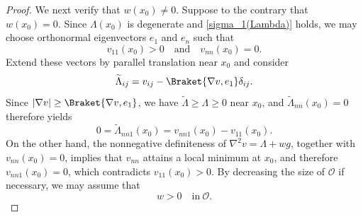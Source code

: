 \documentclass[11pt]{amsart}
\numberwithin{theorem}{section}
\numberwithin{equation}{section}
\begin{document}
\begin{proof}
We next verify that $w(x_0)\neq 0$. Suppose to the contrary that $w(x_0)=0$. Since $\Lambda(x_0)$ is degenerate and \eqref{sigma_1(Lambda)} holds, we may choose orthonormal eigenvectors $e_1$ and $e_n$ such that $$v_{11}(x_0)>0\quad\mathrm{and}\quad v_{nn}(x_0)=0.$$ Extend these vectors by parallel translation near $x_0$ and consider $$\widetilde{\Lambda}_{ij}=v_{ij}-\Braket{\nabla v,e_1}\delta_{ij}.$$ Since $|\nabla v|\geq\Braket{\nabla v,e_1}$, we have $\widetilde{\Lambda}\geq\Lambda\geq 0$ near $x_0$, and $\widetilde{\Lambda}_{nn}(x_0)=0$ therefore yields $$0=\widetilde{\Lambda}_{nn1}(x_0)=v_{nn1}(x_0)-v_{11}(x_0).$$ On the other hand, the nonnegative definiteness of $\nabla^2v=\Lambda+wg$, together with $v_{nn}(x_0)=0$, implies that $v_{nn}$ attains a local minimum at $x_0$, and therefore $v_{nn1}(x_0)=0$, which contradicts $v_{11}(x_0)>0$. By decreasing the size of $\mathcal{O}$ if necessary, we may assume that $$w>0\quad\mathrm{in}\ \mathcal{O}.$$


\end{proof}
\end{document}
